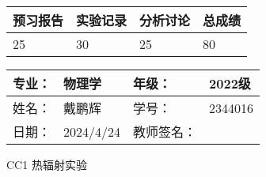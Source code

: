 \documentclass[dvipsnames, svgnames,a4paper,11pt]{article}
\begin{document}
\begin{table}
	\renewcommand\arraystretch{1.7}
	\begin{tabularx}{\textwidth}{
		|X|X|X|X
		|X|X|X|X|}
	\hline
	\multicolumn{2}{|c|}{预习报告}&\multicolumn{2}{|c|}{实验记录}&\multicolumn{2}{|c|}{分析讨论}&\multicolumn{2}{|c|}{总成绩}\\
	\hline
	\LARGE25 & & \LARGE30 & & \LARGE25 & & \LARGE80 & \\
	\hline
	\end{tabularx}
\end{table}


\begin{table}
	\renewcommand\arraystretch{1.7}
	\begin{tabularx}{\textwidth}{|X|X|X|X|}
	\hline
	专业：& 物理学 &年级：& 2022级\\
	\hline
	姓名：& 戴鹏辉  & 学号： & 2344016 \\
	\hline
	日期：& 2024/4/24 & 教师签名：& \\
	\hline
	\end{tabularx}
\end{table}

\begin{center}
	\LARGE CC1 \quad 热辐射实验
\end{center}
\end{document}
